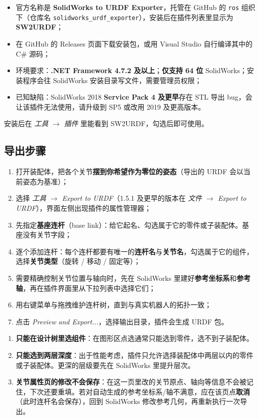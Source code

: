 \begin{itemize}
	\item 官方名称是 \textbf{SolidWorks to URDF Exporter}，托管在 GitHub 的 \texttt{ros} 组织下（仓库名 \texttt{solidworks\_urdf\_exporter}），安装后在插件列表里显示为 \textbf{SW2URDF}；
	\item 在 GitHub 的 Releases 页面下载安装包，或用 Visual Studio 自行编译其中的 C\# 源码；
	\item 环境要求：\textbf{.NET Framework 4.7.2 及以上}；\textbf{仅支持 64 位} SolidWorks；安装程序会往 SolidWorks 安装目录写文件，需要管理员权限；
	\item 已知缺陷：SolidWorks 2018 \textbf{Service Pack 4 及更早}存在 STL 导出 bug，会让该插件无法使用，请升级到 SP5 或改用 2019 及更高版本。
\end{itemize}

安装后在 \textit{工具 $\rightarrow$ 插件} 里能看到 SW2URDF，勾选后即可使用。

\subsection{导出步骤}

\begin{enumerate}
	\item 打开装配体，把各个关节\textbf{摆到你希望作为零位的姿态}（导出的 URDF 会以当前姿态为基准）；
	\item 选择 \textit{工具 $\rightarrow$ Export to URDF}（1.5.1 及更早的版本在 \textit{文件 $\rightarrow$ Export to URDF}），界面左侧出现插件的属性管理器；
	\item 先指定\textbf{基座连杆}（base link）：给它起名、勾选属于它的零件或子装配体。基座没有关节字段；
	\item 逐个添加连杆：每个连杆都要有唯一的\textbf{连杆名}与\textbf{关节名}，勾选属于它的组件，选择\textbf{关节类型}（旋转 / 移动 / 固定等）；
	\item 需要精确控制关节位置与轴向时，先在 SolidWorks 里建好\textbf{参考坐标系}和\textbf{参考轴}，再在插件界面里从下拉列表中选择它们；
	\item 用右键菜单与拖拽维护连杆树，直到与真实机器人的拓扑一致；
	\item 点击 \textit{Preview and Export...}，选择输出目录，插件会生成 URDF 包。
\end{enumerate}

\begin{warnbox}[三个容易卡住的限制]
	\begin{enumerate}
		\item \textbf{只能在设计树里选组件}：在图形区点选通常只能选到零件，选不到子装配体。
		\item \textbf{只能选到两层深度}：出于性能考虑，插件只允许选择装配体中两层以内的零件或子装配体。更深的层级要先在 SolidWorks 里提升层次。
		\item \textbf{关节属性页的修改不会保存}：在这一页里改的关节原点、轴向等信息不会被记住，下次还要重填。若对自动生成的参考坐标系/轴不满意，应在该页点\textbf{取消}（此时连杆名会保存），回到 SolidWorks 修改参考几何，再重新执行一次导出。
	\end{enumerate}
\end{warnbox}

